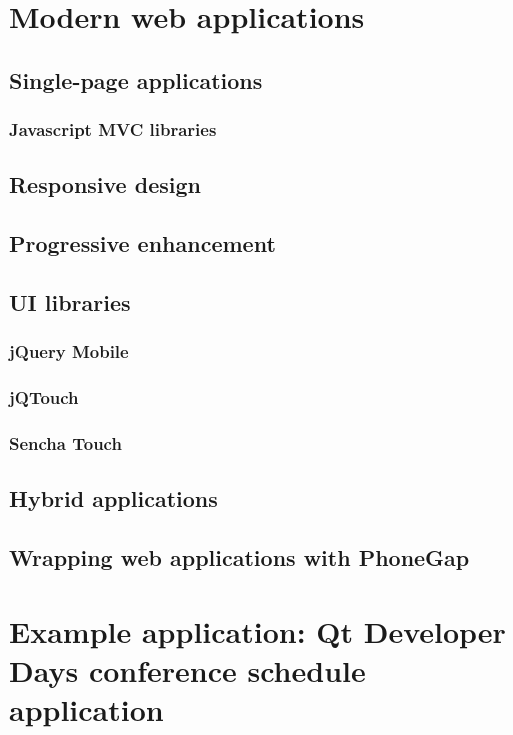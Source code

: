 \documentclass[a4paper,12pt]{article}
\begin{document}
\section{Modern web applications}

\subsection{Single-page applications}
\subsubsection{Javascript MVC libraries}

\subsection{Responsive design}
\subsection{Progressive enhancement}

\subsection{UI libraries}
\subsubsection{jQuery Mobile}
\subsubsection{jQTouch}
\subsubsection{Sencha Touch}

\subsection{Hybrid applications}
\subsection{Wrapping web applications with PhoneGap}

\section{Example application: Qt Developer Days conference schedule application}
\end{document}
